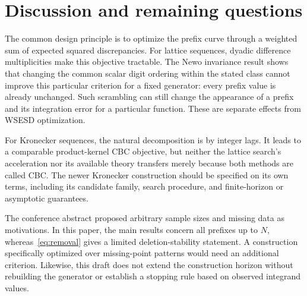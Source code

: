 \section{Discussion and remaining questions}\label{sec:discussion}
The common design principle is to optimize the prefix curve through a
weighted sum of expected squared discrepancies. For lattice sequences,
dyadic difference multiplicities make this objective tractable. The Newo
invariance result shows that changing the common scalar digit ordering
within the stated class cannot improve this particular criterion for a
fixed generator: every prefix value is already unchanged. Such scrambling
can still change the appearance of a prefix and its integration error for
a particular function. These are separate effects from WSESD optimization.

For Kronecker sequences, the natural decomposition is by integer lags.
It leads to a comparable product-kernel CBC objective, but neither the
lattice search's acceleration nor its available theory transfers merely
because both methods are called CBC. The newer Kronecker construction
should be specified on its own terms, including its candidate family,
search procedure, and finite-horizon or asymptotic guarantees.

The conference abstract proposed arbitrary sample sizes and missing data
as motivations. In this paper, the main results concern all prefixes up to
$N$, whereas~\eqref{eq:removal} gives a limited deletion-stability statement.
A construction specifically optimized over missing-point patterns would
need an additional criterion. Likewise, this draft does not extend the
construction horizon without rebuilding the generator or establish
a stopping rule based on observed integrand values.

